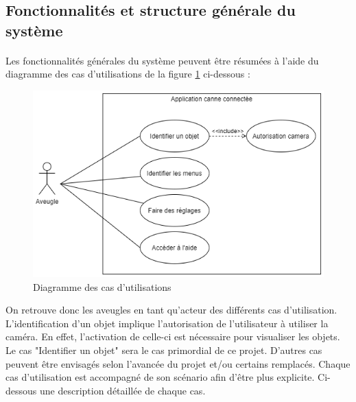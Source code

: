 \documentclass[CDS,UTF8,final]{EPURapport}
\begin{document}
\subsection{Fonctionnalités et structure générale du système}
\paragraph{}
Les fonctionnalités générales du système peuvent être résumées à l'aide du diagramme des cas d'utilisations de la figure \ref{fig:usecasediagram} ci-dessous :\par

\newpage

\begin{figure}[h!]
  \includegraphics[width=\linewidth]{images/UseCaseDiagram.png}
  \caption{Diagramme des cas d'utilisations}
  \label{fig:usecasediagram}
\end{figure}

On retrouve donc les aveugles en tant qu'acteur des différents cas d'utilisation. L'identification d'un objet implique l'autorisation de l'utilisateur à utiliser la caméra. En effet, l'activation de celle-ci est nécessaire pour visualiser les objets. Le cas "Identifier un objet" sera le cas primordial de ce projet. D'autres cas peuvent être envisagés selon l'avancée du projet et/ou certains remplacés. Chaque cas d'utilisation est accompagné de son scénario afin d'être plus explicite. Ci-dessous une description détaillée de chaque cas.\par
\end{document}
